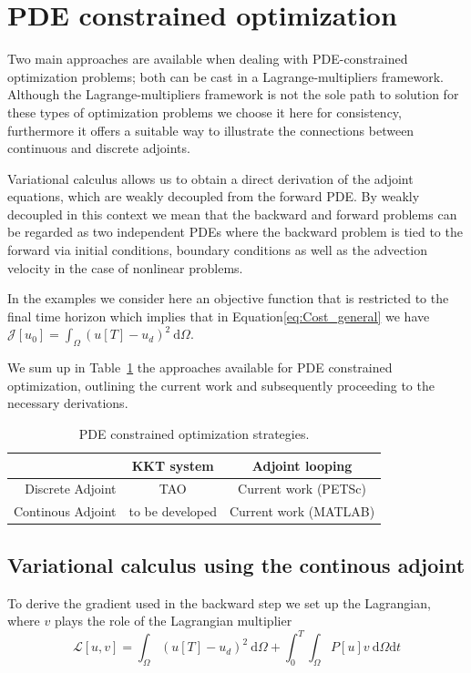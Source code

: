 \documentclass[10pt]{article}
\renewcommand{\d}{\mathrm{d}}
\begin{document}
\section{PDE constrained optimization}

Two main approaches are available when dealing with PDE-constrained optimization problems; both can be cast in a Lagrange-multipliers framework. Although the Lagrange-multipliers framework is not the sole path to solution for these types of optimization problems we choose it here for consistency, furthermore it offers a suitable way to illustrate the connections between continuous and discrete adjoints.

Variational calculus allows us to obtain a direct derivation of the adjoint equations, which are weakly decoupled from the forward PDE. By weakly decoupled in this context we mean that the backward and forward problems can be regarded as two independent PDEs where the backward problem is tied to the forward via initial conditions, boundary conditions as well as the advection velocity in the case of nonlinear problems.

In the examples we consider here an objective function that is  restricted to the final time horizon which implies that in Equation\ref{eq:Cost_general} we have $\mathcal{J}[u_0]=\int_{\Omega}( u[T]- u_d)^2 \ \d \Omega$. 

We sum up in Table~\ref{sum} the approaches available for PDE constrained optimization, outlining the current work and subsequently proceeding to the necessary derivations.

\begin{table}
\centering
\begin{tabular}{|r|c|c|}
  \hline
   & KKT system & Adjoint looping \\
  \hline\hline
  Discrete Adjoint & TAO\footnotemark
   & Current work (PETSc) \\ 
  Continous Adjoint& to be developed & Current work (MATLAB)\\
  \hline
\end{tabular}
\caption{PDE constrained optimization strategies.}\label{sum}
\end{table}
\subsection{Variational calculus using the continous adjoint\label{sec:adj:continuous}} 

To derive the gradient used in the backward step we set up the Lagrangian, where $v$ plays the role of the Lagrangian multiplier
$$\mathcal{L}[ u,  v]=\int_{\Omega}( u[T]- u_d)^2 \ \d \Omega +\int_0^T\int_{\Omega} P[ u]  v \ \d \Omega \d t $$
\end{document}
